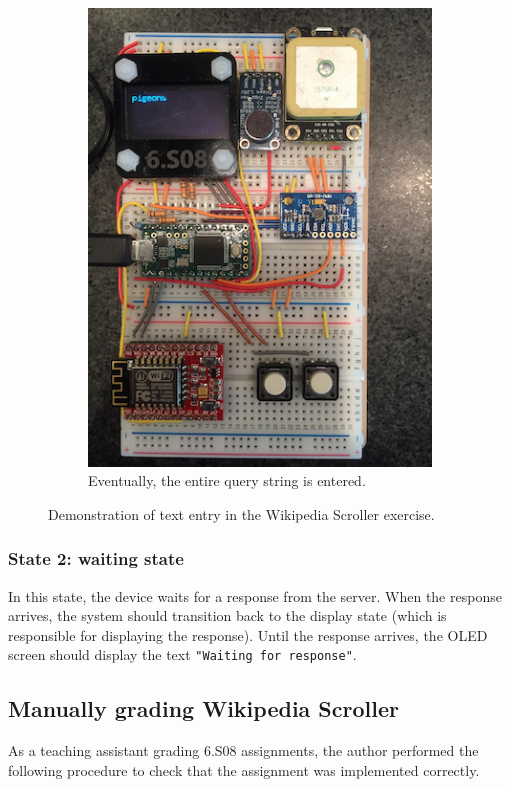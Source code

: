 \documentclass[12pt]{article}
\begin{document}
\begin{figure}
\begin{subfigure}[b]{.3\linewidth}
\includegraphics[width=\linewidth]{text-pigeons}
\caption{Eventually, the entire query string is entered.}
\label{fig:text-pigeons}
\end{subfigure}

\caption{Demonstration of text entry in the Wikipedia Scroller exercise.}
\label{fig:pigeon-entry}
\end{figure}

\subsubsection{State 2: waiting state}
In this state, the device waits for a response from the server.  When the response arrives, the system should transition back to the display state (which is responsible for displaying the response).  Until the response arrives, the OLED screen should display the text \texttt{"Waiting for response"}.

\subsection{Manually grading Wikipedia Scroller}
\label{sec:manual-wiki-grade}
As a teaching assistant grading 6.S08 assignments, the author performed the following procedure to check that the assignment was implemented correctly.
\end{document}
